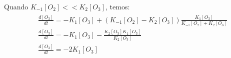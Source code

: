 Quando $K_{-1} [O_2] << K_2 [O_3]$, temos:
\begin{gather}
    \begin{align}
        & \frac{d[O_3]}{dt} = -K_1 [O_3] + (K_{-1} [O_2] - K_2 [O_3]) \frac{K_1 [O_3]}{K_{-1} [O_2] + K_2 [O_3]} \\
        & \frac{d[O_3]}{dt} = -K_1[O_3] - \frac{K_2 [O_3] K_1[O_3]}{K_2[O_3]} \\
        & \frac{d[O_3]}{dt} = -2K_1 [O_3]
    \end{align}
\end{gather}